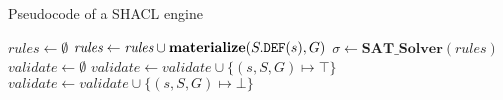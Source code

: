     \begin{algorithm}
    \caption{Pseudocode of a SHACL engine} \label{algo:shacl_engine}
    \begin{algorithmic}[1] 
        \State $\textit{rules} \gets \emptyset$ \label{algo:shacl_engine:matStart}
    	    \State $\textit{rules} \gets \textit{rules} \cup \textbf{materialize}(S.\texttt{DEF}(s), G)$
    	\EndFor \label{algo:shacl_engine:matEnd}
    	\State $\sigma \gets \textbf{SAT\_Solver}(\textit{rules})$ \label{algo:shacl_engine:sat_solver}
    	\State $\textit{validate} \gets \emptyset$ \label{algo:shacl_engine:convertStart}
    	    \State $\textit{validate} \gets \textit{validate} \cup \{(s,S,G) \mapsto \top\}$
    	\EndFor
    	    \State $\textit{validate} \gets \textit{validate} \cup \{(s,S,G) \mapsto \bot\}$
    	\EndFor \label{algo:shacl_engine:convertEnd}
    	\State {}
    \EndFunction
    \end{algorithmic}
    \end{algorithm}
